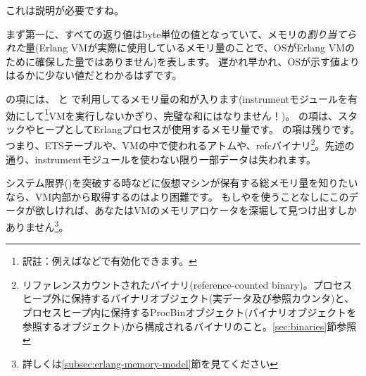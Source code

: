 これは説明が必要ですね。

まず第一に、すべての返り値はbyte単位の値となっていて、メモリの\emph{割り当てられた}量(Erlang VMが実際に使用しているメモリ量のことで、OSがErlang VMのために確保した量ではありません)を表します。
遅かれ早かれ、OSが示す値よりはるかに少ない値だとわかるはずです。

の項には、 と  で利用してるメモリ量の和が入ります(instrumentモジュールを有効にして\footnote{訳註：例えばなどで有効化できます。}VMを実行しないかぎり、完璧な和にはなりません！)。
の項は、スタックやヒープとしてErlangプロセスが使用するメモリ量です。
の項は残りです。つまり、ETSテーブルや、VMの中で使われるアトムや、refcバイナリ\footnote{リファレンスカウントされたバイナリ(reference-counted binary)。プロセスヒープ外に保持するバイナリオブジェクト(実データ及び参照カウンタ)と、プロセスヒープ内に保持するProcBinオブジェクト(バイナリオブジェクトを参照するオブジェクト)から構成されるバイナリのこと。\ref{sec:binaries}節参照}。先述の通り、instrumentモジュールを使わない限り一部データは失われます。

システム限界()を突破する時などに仮想マシンが保有する総メモリ量を知りたいなら、VM内部から取得するのはより困難です。 
もしやを使うことなしにこのデータが欲しければ、あなたはVMのメモリアロケータを深堀して見つけ出すしかありません\footnote{詳しくは\ref{subsec:erlang-memory-model}節を見てください}。

